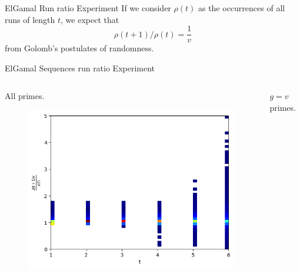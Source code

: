 

\begin{frame}{ElGamal Run ratio Experiment}
    If we consider $\rho(t)$ as the occurrences of all runs of length $t$, we expect that 
    $$ \rho(t+1)/\rho(t) = \frac{1}{v} $$
    from Golomb's postulates of randomness.
\end{frame}


\begin{frame}{ElGamal Sequences run ratio Experiment}
    \begin{columns}
        \begin{column}{0.45\textwidth}
        \begin{center}
            All primes.
        \end{center}
            \begin{figure}
                \centering
                \includegraphics[width=\textwidth]{figures/AllDataNormalizedrunratio.png}
            \end{figure}
        \end{column}
        \begin{column}{0.45\textwidth}
        \begin{center}
            $g = v$ primes.
        \end{center}
            \begin{figure}
                \centering

\end{figure}
\end{column}
\end{columns}
\end{frame}
